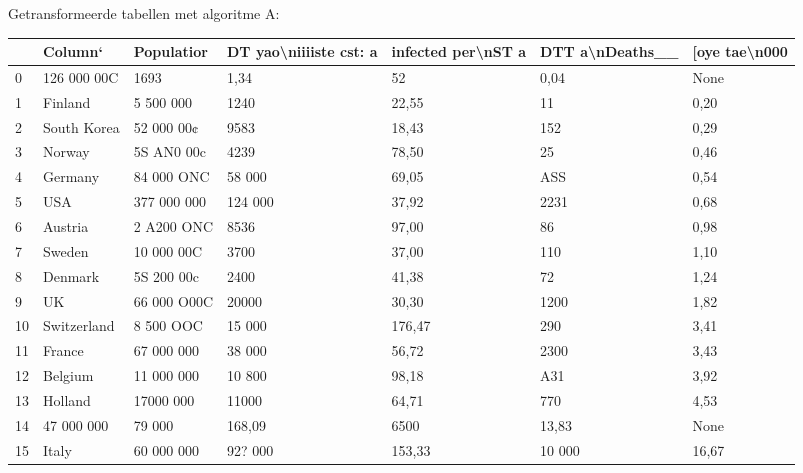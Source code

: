Getransformeerde tabellen met algoritme A:

\begin{tabular}{lllllll}
\toprule
{} &      Column‘ &   Populatior & DT yao\textbackslash niiiiste cst: a & infected per\textbackslash nST a & DTT a\textbackslash nDeaths\_\_ & [oye tae\textbackslash n000 \\
\midrule
0  &  126 000 00C &         1693 &                   1,34 &                 52 &            0,04 &          None \\
1  &      Finland &    5 500 000 &                   1240 &              22,55 &              11 &          0,20 \\
2  &  South Korea &   52 000 00¢ &                   9583 &              18,43 &             152 &          0,29 \\
3  &       Norway &   5S AN0 00c &                   4239 &              78,50 &              25 &          0,46 \\
4  &      Germany &   84 000 ONC &                 58 000 &              69,05 &             ASS &          0,54 \\
5  &          USA &  377 000 000 &                124 000 &              37,92 &            2231 &          0,68 \\
6  &      Austria &   2 A200 ONC &                   8536 &              97,00 &              86 &          0,98 \\
7  &       Sweden &   10 000 00C &                   3700 &              37,00 &             110 &          1,10 \\
8  &      Denmark &   5S 200 00c &                   2400 &              41,38 &              72 &          1,24 \\
9  &           UK &  66 000 O00C &                  20000 &              30,30 &            1200 &          1,82 \\
10 &  Switzerland &    8 500 OOC &                 15 000 &             176,47 &             290 &          3,41 \\
11 &       France &   67 000 000 &                 38 000 &              56,72 &            2300 &          3,43 \\
12 &      Belgium &   11 000 000 &                 10 800 &              98,18 &             A31 &          3,92 \\
13 &      Holland &    17000 000 &                  11000 &              64,71 &             770 &          4,53 \\
14 &   47 000 000 &       79 000 &                 168,09 &               6500 &           13,83 &          None \\
15 &        Italy &   60 000 000 &                92? 000 &             153,33 &          10 000 &         16,67 \\
\bottomrule
\end{tabular}

